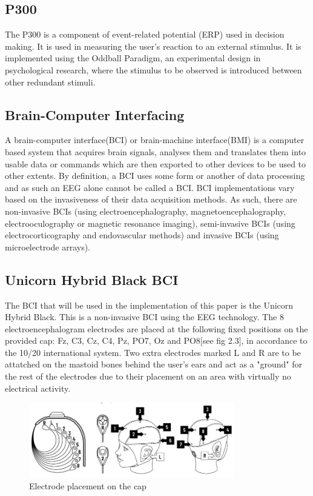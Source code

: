\subsection{P300}
The P300 is a component of event-related potential (ERP) used in decision making. It is used in measuring the user's reaction to an external stimulus. It is implemented using the Oddball Paradigm, an experimental design in psychological research, where the stimulus to be observed is introduced between other redundant stimuli.

\subsection{Brain-Computer Interfacing}
A brain-computer interface(BCI) or brain-machine interface(BMI) is a computer based  system that acquires brain signals, analyses them and translates them into usable data or commands which are then exported to other devices to be used to other extents. By definition, a BCI uses some form or another of data processing and as such an EEG alone cannot be called a BCI\cite{Shih_2012}. BCI implementations vary based on the invasiveness of their data acquisition methods. As such, there are non-invasive BCIs (using electroencephalography, magnetoencephalography, electrooculography or magnetic resonance imaging), semi-invasive BCIs (using electrocorticography and endovascular methods) and invasive BCIs (using microelectrode arrays).

\subsection{Unicorn Hybrid Black BCI}
The BCI that will be used in the implementation of this paper is the Unicorn Hybrid Black. This is a non-invasive BCI using the EEG technology. The 8 electroencephalogram electrodes are placed at the following fixed positions on the provided cap: Fz, C3, Cz, C4, Pz, PO7, Oz and PO8[see fig 2.3], in accordance to the 10/20 international system. Two extra electrodes marked L and R are to be attatched on the mastoid bones behind the user's ears and act as a "ground" for the rest of the electrodes due to their placement on an area with virtually no electrical activity. 

\begin{figure}[H]
  \centering
  \includegraphics[width=0.8\textwidth]{Graphics/Electrode Placement.png}
  \caption{Electrode placement on the cap}
\end{figure}

